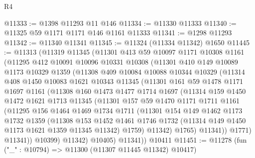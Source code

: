 \begin{lexlean}{R4}
\begin{coremodule}
@11333 := @1398 @11293 @11 @146
@11334 := @11330 @11333
@11340 := @11325 @59 @1171 @1171 @146 @1161 @11333
@11341 := @1298 @11293
@11342 := @11340 @11341
@11345 := @11324 (@11334 @11342) @1650
@11445 := @11313
    (@11319
      @11345
      (@11301
        @413
        @59
        @10097
        @1171
        @10308
        @1161
        (@11295
          @412
          @10091
          @10096
          @10331
          @10308
          (@11301
            @410
            @149
            @10089
            @1173
            @10329
            @1359
            (@11308
              @409
              @10084
              @10088
              @10344
              @10329
              (@11314
                @408
                @1450
                @10083
                @1621
                @10343
                @11345
                (@11301
                  @161
                  @59
                  @1478
                  @1171
                  @1697
                  @1161
                  (@11308
                    @160
                    @1473
                    @1477
                    @1714
                    @1697
                    (@11314
                      @159
                      @1450
                      @1472
                      @1621
                      @1713
                      @11345
                      (@11301
                        @157
                        @59
                        @1470
                        @1171
                        @1711
                        @1161
                        (@11295
                          @156
                          @1464
                          @1469
                          @1734
                          @1711
                          (@11301
                            @154
                            @149
                            @1462
                            @1173
                            @1732
                            @1359
                            (@11308
                              @153
                              @1452
                              @1461
                              @1746
                              @1732
                              (@11314 @149 @1450 @1173 @1621 @1359 @11345 @11342)
                              @1759)
                            @11342)
                          @1765)
                        @11341))
                    @1771)
                  @11341))
              @10399)
            @11342)
          @10405)
        @11341))
    @10411
@11451 := @11278 (fun ("_" : @10794) => @11300 (@11307 @11445 @11342) @10417)

\end{coremodule}
\end{lexlean}

